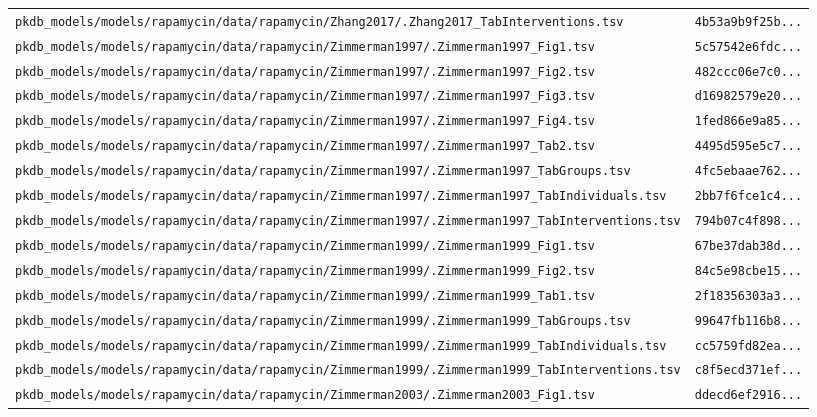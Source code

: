 \documentclass{article}
\begin{document}
\begin{longtable}{ll}
\texttt{pkdb\_models/models/rapamycin/data/rapamycin/Zhang2017/.Zhang2017\_TabInterventions.tsv} & \texttt{4b53a9b9f25b...} \\
\texttt{pkdb\_models/models/rapamycin/data/rapamycin/Zimmerman1997/.Zimmerman1997\_Fig1.tsv} & \texttt{5c57542e6fdc...} \\
\texttt{pkdb\_models/models/rapamycin/data/rapamycin/Zimmerman1997/.Zimmerman1997\_Fig2.tsv} & \texttt{482ccc06e7c0...} \\
\texttt{pkdb\_models/models/rapamycin/data/rapamycin/Zimmerman1997/.Zimmerman1997\_Fig3.tsv} & \texttt{d16982579e20...} \\
\texttt{pkdb\_models/models/rapamycin/data/rapamycin/Zimmerman1997/.Zimmerman1997\_Fig4.tsv} & \texttt{1fed866e9a85...} \\
\texttt{pkdb\_models/models/rapamycin/data/rapamycin/Zimmerman1997/.Zimmerman1997\_Tab2.tsv} & \texttt{4495d595e5c7...} \\
\texttt{pkdb\_models/models/rapamycin/data/rapamycin/Zimmerman1997/.Zimmerman1997\_TabGroups.tsv} & \texttt{4fc5ebaae762...} \\
\texttt{pkdb\_models/models/rapamycin/data/rapamycin/Zimmerman1997/.Zimmerman1997\_TabIndividuals.tsv} & \texttt{2bb7f6fce1c4...} \\
\texttt{pkdb\_models/models/rapamycin/data/rapamycin/Zimmerman1997/.Zimmerman1997\_TabInterventions.tsv} & \texttt{794b07c4f898...} \\
\texttt{pkdb\_models/models/rapamycin/data/rapamycin/Zimmerman1999/.Zimmerman1999\_Fig1.tsv} & \texttt{67be37dab38d...} \\
\texttt{pkdb\_models/models/rapamycin/data/rapamycin/Zimmerman1999/.Zimmerman1999\_Fig2.tsv} & \texttt{84c5e98cbe15...} \\
\texttt{pkdb\_models/models/rapamycin/data/rapamycin/Zimmerman1999/.Zimmerman1999\_Tab1.tsv} & \texttt{2f18356303a3...} \\
\texttt{pkdb\_models/models/rapamycin/data/rapamycin/Zimmerman1999/.Zimmerman1999\_TabGroups.tsv} & \texttt{99647fb116b8...} \\
\texttt{pkdb\_models/models/rapamycin/data/rapamycin/Zimmerman1999/.Zimmerman1999\_TabIndividuals.tsv} & \texttt{cc5759fd82ea...} \\
\texttt{pkdb\_models/models/rapamycin/data/rapamycin/Zimmerman1999/.Zimmerman1999\_TabInterventions.tsv} & \texttt{c8f5ecd371ef...} \\
\texttt{pkdb\_models/models/rapamycin/data/rapamycin/Zimmerman2003/.Zimmerman2003\_Fig1.tsv} & \texttt{ddecd6ef2916...} \\

\end{longtable}
\end{document}
